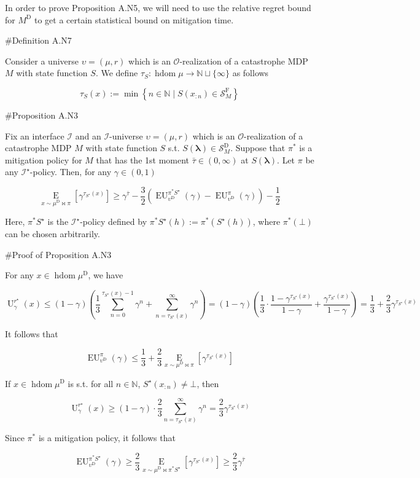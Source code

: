 \documentclass[a4paper]{article}
\newcommand{\AP}[1]{\left(#1\right)}
\newcommand{\AB}[1]{\left[#1\right]}
\newcommand{\AC}[1]{\left\{#1\right\}}
\newcommand{\Ea}[2]{\underset{#1}{\operatorname{E}}\AB{#2}}
\newcommand{\Nats}{\mathbb{N}}
\newcommand{\Estr}{\boldsymbol{\lambda}}
\newcommand{\Ob}{\mathcal{O}}
\newcommand{\St}{\mathcal{S}}
\newcommand{\In}{\mathcal{I}}
\DeclareMathOperator{\HD}{hdom}
\newcommand{\RMD}{\mathrm{D}}
\newcommand{\RMF}{\mathrm{F}}
\newcommand{\SF}{\St^{\RMF}}
\newcommand{\SD}{\St^{\RMD}}
\newcommand{\MD}{M^{\RMD}}
\newcommand{\UD}{\upsilon^{\RMD}}
\newcommand{\Ut}{\operatorname{U}}
\newcommand{\EU}{\operatorname{EU}}
\begin{document}
In order to prove Proposition A.N5, we will need to use the relative regret bound for $\MD$ to get a certain statistical bound on mitigation time.

\#Definition A.N7

Consider a universe $\upsilon=(\mu,r)$ which is an $\Ob$-realization of a catastrophe MDP $M$ with state function $S$. We define $\tau_S: \HD{\mu} \rightarrow \Nats \sqcup \{\infty\}$ as follows

$$\tau_S(x) := \min\AC{n \in \Nats \mid S\AP{x_{:n}} \in \SF_M}$$

\#Proposition A.N3

Fix an interface $\In$ and an $\In$-universe $\upsilon=(\mu,r)$ which is an $\Ob$-realization of a catastrophe MDP $M$ with state function $S$ s.t. $S(\Estr)\in\SD_M$. Suppose that $\pi^*$ is a mitigation policy for $M$ that has the 1st moment $\bar{\tau}\in(0,\infty)$ at $S(\Estr)$. Let $\pi$ be any $\In^\star$-policy. Then, for any $\gamma\in(0,1)$

$$\Ea{x\sim\mu^\RMD\bowtie\pi}{\gamma^{\tau_{S^\star}(x)}} \geq {\gamma^{\bar{\tau}}}-\frac{3}{2}\AP{\EU_{\UD}^{\pi^* S^\star}(\gamma)-\EU_{\UD}^{\pi}(\gamma)}-\frac{1}{2}$$

Here, $\pi^* S^\star$ is the $\In^\star$-policy defined by $\pi^*S^\star(h):=\pi^*\AP{S^\star(h)}$, where $\pi^*(\bot)$ can be chosen arbitrarily.

\#Proof of Proposition A.N3

For any $x \in \HD{\mu^\RMD}$, we have

$$\Ut^{r^\star}_\gamma(x) \leq (1-\gamma)\AP{\frac{1}{3}\sum_{n=0}^{\tau_{S^\star}(x)-1}{\gamma^n} + \sum_{n=\tau_{S^\star}(x)}^\infty \gamma^n} = (1-\gamma)\AP{\frac{1}{3} \cdot \frac{1 - \gamma^{\tau_{S^\star}(x)}}{1-\gamma}+\frac{\gamma^{\tau_{S^\star}(x)}}{1-\gamma}}=\frac{1}{3}+\frac{2}{3}\gamma^{\tau_{S^\star}(x)}$$

It follows that

$$\EU_{\UD}^\pi(\gamma) \leq \frac{1}{3}+\frac{2}{3}\Ea{x\sim\mu^\RMD\bowtie\pi}{\gamma^{\tau_{S^\star}(x)}}$$

If $x \in \HD{\mu^\RMD}$ is s.t. for all $n\in\Nats$, $S^\star\AP{x_{:n}}\ne\bot$, then

$$\Ut^{r^\star}_\gamma(x) \geq (1-\gamma)\cdot \frac{2}{3} \sum_{n=\tau_{S^\star}(x)}^\infty \gamma^n = \frac{2}{3}\gamma^{\tau_{S^\star}(x)}$$

Since $\pi^*$ is a mitigation policy, it follows that

$$\EU_{\UD}^{\pi^*S^\star}(\gamma) \geq \frac{2}{3}\Ea{x\sim\mu^\RMD\bowtie\pi^*S^\star}{\gamma^{\tau_{S^\star}(x)}} \geq \frac{2}{3}\gamma^{\bar{\tau}}$$
\end{document}
